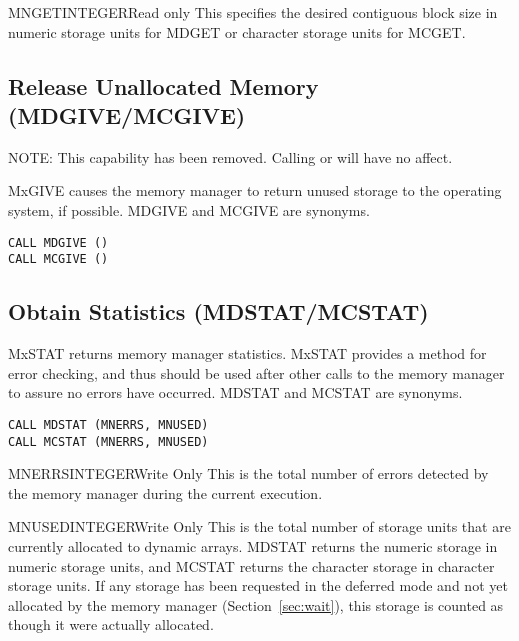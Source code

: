 \begin{argy}{MNGET}{INTEGER}{Read only}
This specifies the desired contiguous block size in numeric storage units
for MDGET or character storage units for MCGET.
\end{argy}

\subsection{Release Unallocated Memory (MDGIVE/MCGIVE)}
NOTE: This capability has been removed.  Calling  or  will have no affect.

MxGIVE
causes the memory manager to return unused storage to the operating
system, if possible. MDGIVE and MCGIVE are synonyms.
\begin{verbatim}
CALL MDGIVE ()
CALL MCGIVE ()
\end{verbatim}

\subsection{Obtain Statistics (MDSTAT/MCSTAT)}
MxSTAT returns memory manager statistics.  MxSTAT provides a method
for error checking, and thus should be used after other calls to the memory
manager to assure no errors have occurred. MDSTAT and MCSTAT are synonyms.
\begin{verbatim}
CALL MDSTAT (MNERRS, MNUSED)
CALL MCSTAT (MNERRS, MNUSED)
\end{verbatim}

\begin{argy}{MNERRS}{INTEGER}{Write Only}
This is the total number of errors detected by the memory manager during the
current execution.
\end{argy}

\begin{argy}{MNUSED}{INTEGER}{Write Only}
This is the total number of storage units that are currently allocated to
dynamic arrays. MDSTAT returns the numeric storage in numeric storage units,
and MCSTAT returns the character storage in character storage units. If any
storage has been requested in the deferred mode and not yet allocated by the
memory manager (Section~\ref{sec:wait}), this storage is counted as though
it were actually allocated.
\end{argy}

